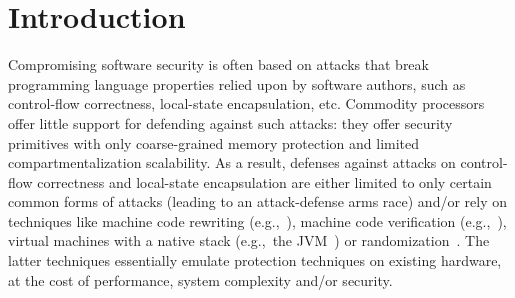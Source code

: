\documentclass[acmsmall,review]{acmart}\settopmatter{printfolios=true}
\begin{document}




\maketitle


\section{Introduction}
\label{sec:introduction}

Compromising software security is often based on attacks that break programming
language properties relied upon by software authors, such as control-flow
correctness, local-state encapsulation, etc. Commodity processors offer little
support for defending against such attacks: they offer security primitives with
only coarse-grained memory protection and limited compartmentalization
scalability. As a result, defenses against attacks on control-flow correctness
and local-state encapsulation are either limited to only certain common forms of
attacks (leading to an attack-defense arms race) and/or rely on techniques like
machine code rewriting
(e.g.,~\citet{wahbe_efficient_1993,abadi_control-flow_2005}), machine code
verification (e.g.,~\citet{morrisett_system_1999}), virtual machines with a
native stack (e.g.,~the JVM~\citep{lindholm_java_2014}) or
randomization~\citep{forrest_building_1997}. The latter techniques essentially
emulate protection techniques on existing hardware, at the cost of performance,
system complexity and/or security.
\end{document}
